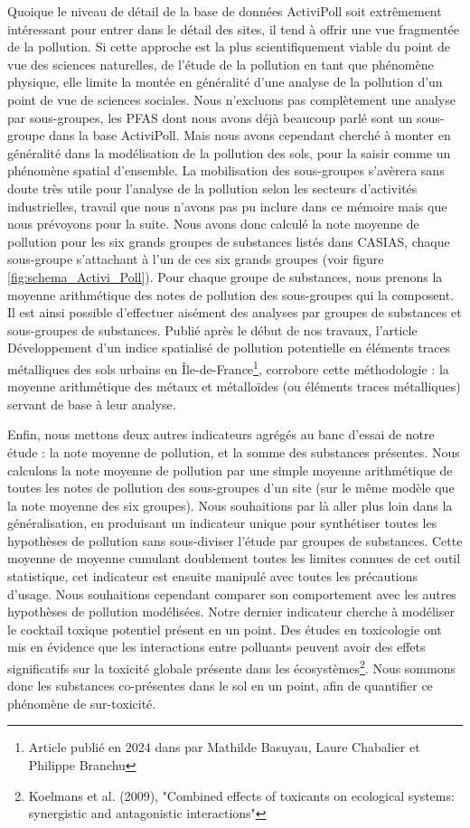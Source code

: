 \documentclass[a4paper,twoside,12pt]{book}
\begin{document}
Quoique le niveau de détail de la base de données ActiviPoll soit extrêmement intéressant pour entrer dans le détail des sites, il tend à offrir une vue fragmentée de la pollution. Si cette approche est la plus scientifiquement viable du point de vue des sciences naturelles, de l'étude de la pollution en tant que phénomène physique, elle limite la montée en généralité d'une analyse de la pollution d'un point de vue de sciences sociales. Nous n'excluons pas complètement une analyse par sous-groupes, les PFAS dont nous avons déjà beaucoup parlé sont un sous-groupe dans la base ActiviPoll. Mais nous avons cependant cherché à monter en généralité dans la modélisation de la pollution des sols, pour la saisir comme un phénomène spatial d'ensemble. La mobilisation des sous-groupes s'avèrera sans doute très utile pour l'analyse de la pollution selon les secteurs d'activités industrielles, travail que nous n'avons pas pu inclure dans ce mémoire mais que nous prévoyons pour la suite. Nous avons donc calculé la note moyenne de pollution pour les six grands groupes de substances listés dans CASIAS, chaque sous-groupe s'attachant à l'un de ces six grands groupes (voir figure \ref{fig:schema_Activi_Poll}). Pour chaque groupe de substances, nous prenons la moyenne arithmétique des notes de pollution des sous-groupes qui la composent. Il est ainsi possible d'effectuer aisément des analyses par groupes de substances et sous-groupes de substances. Publié après le début de nos travaux, l'article \og{} Développement d'un indice spatialisé de pollution potentielle en éléments traces métalliques des sols urbains en Île-de-France\fg{}\footnote{Article publié en 2024 dans \cite{charvet_sols_2024} par Mathilde Basuyau, Laure Chabalier et Philippe Branchu}, corrobore cette méthodologie : la moyenne arithmétique des métaux et métalloïdes (ou éléments traces métalliques) servant de base à leur analyse.  

Enfin, nous mettons deux autres indicateurs agrégés au banc d'essai de notre étude : la note moyenne de pollution, et la somme des substances présentes. Nous calculons la note moyenne de pollution par une simple moyenne arithmétique de toutes les notes de pollution des sous-groupes d'un site (sur le même modèle que la note moyenne des six groupes). Nous souhaitions par là aller plus loin dans la généralisation, en produisant un indicateur unique pour synthétiser toutes les hypothèses de pollution sans sous-diviser l'étude par groupes de substances. Cette moyenne de moyenne cumulant doublement toutes les limites connues de cet outil statistique, cet indicateur est ensuite manipulé avec toutes les précautions d'usage. Nous souhaitions cependant comparer son comportement avec les autres hypothèses de pollution modélisées. Notre dernier indicateur cherche à modéliser le cocktail toxique potentiel présent en un point. Des études en toxicologie ont mis en évidence que les interactions entre polluants peuvent avoir des effets significatifs sur la toxicité globale présente dans les écosystèmes\footnote{Koelmans et al. (2009), "Combined effects of toxicants on ecological systems: synergistic and antagonistic interactions"}. Nous sommons donc les substances co-présentes dans le sol en un point, afin de quantifier ce phénomène de sur-toxicité. 
\end{document}
